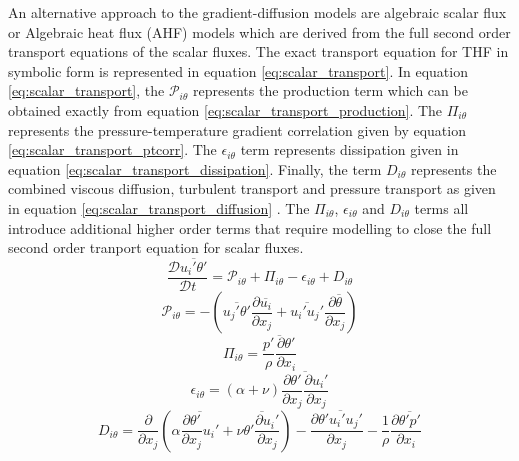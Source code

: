 An alternative approach to the gradient-diffusion models are algebraic scalar flux or Algebraic heat flux (AHF) models which are derived from the full second order transport equations of the scalar fluxes. The exact transport equation for THF in symbolic form is represented in equation \ref{eq:scalar_transport}. In equation \ref{eq:scalar_transport}, the $\mathcal{P}_{i\theta}$ represents the production term which can be obtained exactly from equation \ref{eq:scalar_transport_production}. The $\Pi_{i\theta}$ represents the pressure-temperature gradient correlation given by equation \ref{eq:scalar_transport_ptcorr}. The $\epsilon_{i\theta}$ term represents dissipation given in equation \ref{eq:scalar_transport_dissipation}. Finally, the term $D_{i\theta}$ represents the combined viscous diffusion, turbulent transport and pressure transport as given in equation \ref{eq:scalar_transport_diffusion} \cite{Qiu2008}. The $\Pi_{i\theta}$, $\epsilon_{i\theta}$ and $D_{i\theta}$ terms all introduce additional higher order terms that require modelling to close the full second order tranport equation for scalar fluxes. 
\begin{equation}
\label{eq:scalar_transport}
\frac{\mathcal{D}\overline{u_{i}'\theta'}}{\mathcal{D}t} = \mathcal{P}_{i\theta} + \Pi_{i\theta} - \epsilon_{i\theta} + D_{i\theta}
\end{equation}
\begin{equation}
\label{eq:scalar_transport_production}
\mathcal{P}_{i\theta} = -\left(\overline{u_{j}'\theta'}\frac{\partial \overline{u_{i}}}{\partial x_{j}} + \overline{u_{i}'u_{j}'}\frac{\partial \overline{\theta}}{\partial x_{j}}\right)
\end{equation}
\begin{equation}
\label{eq:scalar_transport_ptcorr}
\Pi_{i\theta} = \overline{\frac{p'}{\rho}\frac{\partial \theta'}{\partial x_{i}}}
\end{equation}
\begin{equation}
\label{eq:scalar_transport_dissipation}
\epsilon_{i\theta} = (\alpha + \nu)\overline{\frac{\partial \theta'}{\partial x_{j}} \frac{\partial u_{i}'}{\partial x_{j}}}
\end{equation}
\begin{equation}
\label{eq:scalar_transport_diffusion}
D_{i\theta} = \frac{\partial}{\partial x_{j}}\left(\alpha\overline{\frac{\partial \theta'}{\partial x_{j}}u_{i}'} + \nu\overline{\theta'\frac{\partial u_{i}'}{\partial x_{j}}} \right) - \frac{\partial \overline{\theta'u_{i}'u_{j}'}}{\partial x_{j}} - \frac{1}{\rho}\frac{\partial \overline{\theta'p'}}{\partial x_{i}}
\end{equation}
